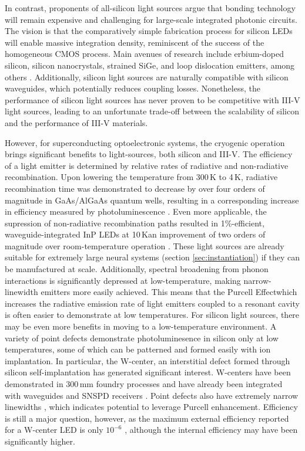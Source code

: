 \documentclass[twocolumn]{article}
\begin{document}
In contrast, proponents of all-silicon light sources argue that bonding technology will remain expensive and challenging for large-scale integrated photonic circuits. The vision is that the comparatively simple fabrication process for silicon LEDs will enable massive integration density, reminiscent of the success of the homogeneous CMOS process. Main avenues of research include erbium-doped silicon, silicon nanocrystals, strained SiGe, and loop dislocation emitters, among others \cite{pavesi2008silicon,again,more,refs,jeff,has,em}. Additionally, silicon light sources are naturally compatible with silicon waveguides, which potentially reduces coupling losses. Nonetheless, the performance of silicon light sources has never proven to be competitive with III-V light sources, leading to an unfortunate trade-off between the scalability of silicon and the performance of III-V materials. 

However, for superconducting optoelectronic systems, the cryogenic operation brings significant benefits to light-sources, both silicon and III-V. The efficiency of a light emitter is determined by relative rates of radiative and non-radiative recombination. Upon lowering the temperature from 300\,K to 4\,K, radiative recombination time was demonstrated to decrease by over four orders of magnitude in GaAs/AlGaAs quantum wells, resulting in a corresponding increase in efficiency measured by photoluminescence \cite{gurioli1991temperature}. Even more applicable, the supression of non-radiative recombination paths resulted in 1\%-efficient, waveguide-integrated InP LEDs at 10\,K\textemdash an improvement of two orders of magnitude over room-temperature operation \cite{dolores2017waveguide}. These light sources are already suitable for extremely large neural systems (section \ref{sec:instantiation}) if they can be manufactured at scale. Additionally, spectral broadening from phonon interactions is significantly depressed at low-temperature, making narrow-linewidth emitters more easily achieved. This means that the Purcell Effect\textemdash which increases the radiative emission rate of light emitters coupled to a resonant cavity \cite{romeira2018purcell}\textemdash is often easier to demonstrate at low temperatures. For silicon light sources, there may be even more benefits in moving to a low-temperature environment. A variety of point defects demonstrate photoluminesence in silicon only at low temperatures, some of which can be patterned and formed easily with ion implantation. In particular, the W-center, an interstitial defect formed through silicon self-implantation has generated significant interest. W-centers have been demonstrated in 300\,mm foundry processes \cite{buckley2020optimization} and have already been integrated with waveguides and SNSPD receivers \cite{buckley2017all}. Point defects also have extremely narrow linewidths \cite{chartrand2018highly}, which indicates potential to leverage Purcell enhancement. Efficiency is still a major question, however, as the maximum external efficiency reported for a W-center LED is only $10^{-6}$ \cite{bao2007point}, although the internal efficiency may have been significantly higher. 
\end{document}
